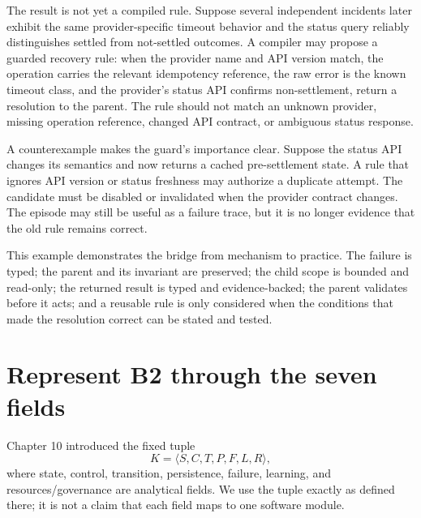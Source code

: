 The result is not yet a compiled rule. Suppose several independent incidents later exhibit the same provider-specific timeout behavior and the status query reliably distinguishes settled from not-settled outcomes. A compiler may propose a guarded recovery rule: when the provider name and API version match, the operation carries the relevant idempotency reference, the raw error is the known timeout class, and the provider's status API confirms non-settlement, return a  resolution to the parent. The rule should not match an unknown provider, missing operation reference, changed API contract, or ambiguous status response.

A counterexample makes the guard's importance clear. Suppose the status API changes its semantics and now returns a cached pre-settlement state. A rule that ignores API version or status freshness may authorize a duplicate attempt. The candidate must be disabled or invalidated when the provider contract changes. The episode may still be useful as a failure trace, but it is no longer evidence that the old rule remains correct.

This example demonstrates the bridge from mechanism to practice. The failure is typed; the parent and its invariant are preserved; the child scope is bounded and read-only; the returned result is typed and evidence-backed; the parent validates before it acts; and a reusable rule is only considered when the conditions that made the resolution correct can be stated and tested.

\section{Represent B2 through the seven fields}
\label{sec:ch13-seven-fields}

Chapter 10 introduced the fixed tuple
\[
  K = \langle S,C,T,P,F,L,R\rangle,
\]
where state, control, transition, persistence, failure, learning, and resources/governance are analytical fields. We use the tuple exactly as defined there; it is not a claim that each field maps to one software module.

